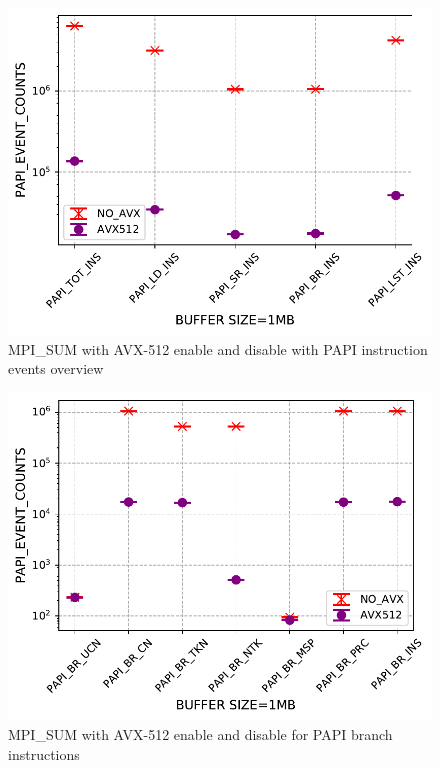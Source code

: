 \documentclass[sigconf]{acmart}
\begin{document}
\begin{figure}[h]
    \centering
    \includegraphics[width=\linewidth]{papi_ins.pdf}
    \caption{MPI\_SUM with AVX-512 enable and disable with PAPI instruction events overview}
    \label{fig:papi_ins}
\end{figure}

\begin{figure}[h]
    \centering
    \includegraphics[width=\linewidth]{papi_br.pdf}
    \caption{MPI\_SUM with AVX-512 enable and disable for PAPI branch instructions}
    \label{fig:papi_br}
\end{figure}
\end{document}
